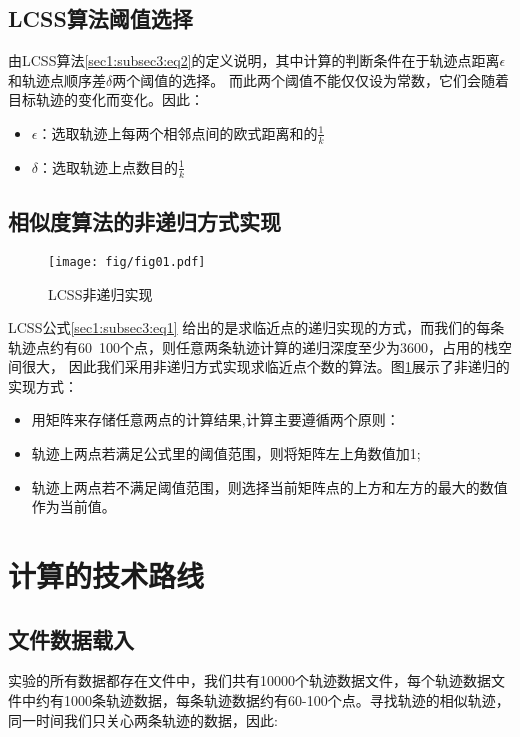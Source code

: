 \documentclass[UTF8]{ctexart}
\begin{document}
\subsection{LCSS算法阈值选择}

由LCSS算法\ref{sec1:subsec3:eq2}的定义说明，其中计算的判断条件在于轨迹点距离$\epsilon$和轨迹点顺序差$\delta$两个阈值的选择。
而此两个阈值不能仅仅设为常数，它们会随着目标轨迹的变化而变化。因此：

\begin{itemize}
	\item $\epsilon$：选取轨迹上每两个相邻点间的欧式距离和的$\frac{1}{k}$
	\item $\delta$：选取轨迹上点数目的$\frac{1}{k}$
\end{itemize}

\subsection{相似度算法的非递归方式实现}
\label{sec2:subsec3}

\begin{figure}[!htbp]
  \centering
  \texttt{[image: fig/fig01.pdf]}\\
  \caption{LCSS非递归实现}
  \label{sec2:subsec3:fg1}
\end{figure}

LCSS公式\ref{sec1:subsec3:eq1} 给出的是求临近点的递归实现的方式，而我们的每条轨迹点约有60~100个点，则任意两条轨迹计算的递归深度至少为3600，占用的栈空间很大，
因此我们采用非递归方式实现求临近点个数的算法。图\ref{sec2:subsec3:fg1}展示了非递归的实现方式：

\begin{itemize}
	\item 用矩阵来存储任意两点的计算结果,计算主要遵循两个原则：
	\item 轨迹上两点若满足公式里的阈值范围，则将矩阵左上角数值加1;
	\item 轨迹上两点若不满足阈值范围，则选择当前矩阵点的上方和左方的最大的数值作为当前值。
\end{itemize}

\section{计算的技术路线}\label{sec3}
\subsection{文件数据载入}
实验的所有数据都存在文件中，我们共有10000个轨迹数据文件，每个轨迹数据文件中约有1000条轨迹数据，每条轨迹数据约有60-100个点。寻找轨迹的相似轨迹，同一时间我们只关心两条轨迹的数据，因此:
\end{document}
